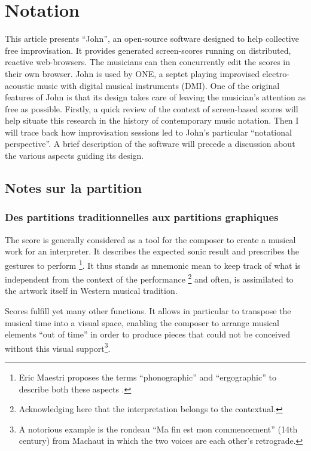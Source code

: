 %
\chapter{Notation}
\label{ch:notation}


This article presents “John”, an open-source software designed to help collective free improvisation. It provides generated screen-scores running on distributed, reactive web-browsers. The musicians can then concurrently edit the scores in their own browser. John is used by ONE, a septet playing improvised electro-acoustic music with digital musical instruments (DMI). One of the original features of John is that its design takes care of leaving the
musician's attention as free as possible.
Firstly, a quick review of the context of screen-based
scores will help situate this research in the history of contemporary music notation. Then I will trace back how improvisation sessions led to John's particular “notational perspective”. A brief description of the software will precede a discussion about the various aspects guiding its design.

\section{Notes sur la partition}

\subsection{Des partitions traditionnelles aux partitions graphiques}
The score is generally considered as a tool for the composer to create a musical work for an interpreter. It describes the expected sonic result and prescribes the gestures to perform \footnote{Eric Maestri proposes the terms “phonographic” and “ergographic” to describe both these aspects .}. It thus stands as mnemonic mean to keep track of what is independent from the context of the performance \footnote{Acknowledging here that the interpretation belongs to the contextual.} and often, is assimilated to the artwork itself in Western musical tradition.

Scores fulfill yet many other functions. It allows in particular to transpose the musical time into a visual space, enabling the composer to arrange musical elements “out of time” in order to produce pieces that could not be conceived without this visual support\footnote{A notorious example is the rondeau “Ma fin est mon commencement” (14th century) from Machaut in which the two voices are each other's retrograde.}.

